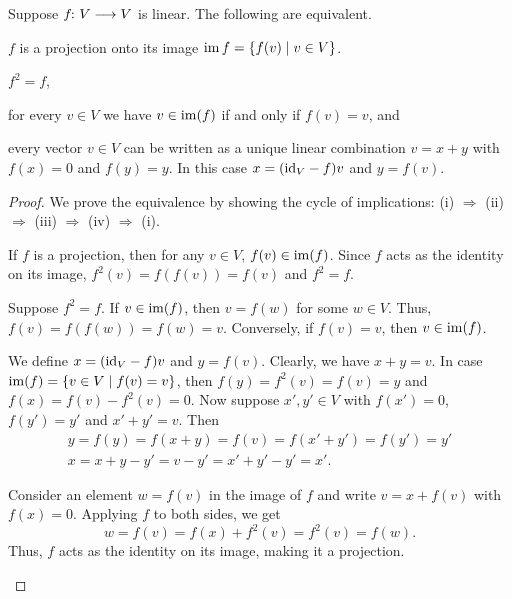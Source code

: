 \documentclass[a4paper, oneside, 12pt]{amsart}
\begin{document}
\begin{lemma}\label{lem:equivalent-characterisations-projections}
  Suppose \(f \from V\to V\) is linear.
  The following are equivalent.
  \begin{thmlist}
    \item \(f\) is a projection onto its image \(\operatorname{im} f =\{f(v) \mid v\in V\}\).
    \item\(f^{2} = f\),
    \item for every  \(v\in V\) we have \(v\in \operatorname{im}(f)\) if and only if \(f(v) = v\), and
    \item every vector \(v\in V\) can be written as a unique linear combination \(v= x+y\) with \(f(x) = 0\) and \(f(y) = y\).
    In this case \(x= (\mathrm{id}_{V} -f) v\) and \(y = f(v)\).
  \end{thmlist}
\end{lemma}
\begin{proof}
  We prove the equivalence by showing the cycle of implications: (i) \(\Rightarrow\) (ii) \(\Rightarrow\) (iii) \(\Rightarrow\) (iv) \(\Rightarrow\) (i).

  \begin{thmlist}[leftmargin=5em]
    \item[(i) \(\Rightarrow\) (ii):]
    If \( f \) is a projection, then for any \( v \in V \), \( f(v) \in \operatorname{im}(f) \). Since \( f \) acts as the identity on its image, \( f^2(v) = f(f(v)) = f(v) \) and \( f^2 = f \).

    \item[(ii) \(\Rightarrow\) (iii):]
    Suppose \( f^2 = f \). If \( v \in \operatorname{im}(f) \), then \( v = f(w) \) for some \( w \in V \). Thus, \( f(v) = f(f(w)) = f(w) = v \). Conversely, if \( f(v) = v \), then \( v \in \operatorname{im}(f) \).

    \item[(iii) \(\Rightarrow\) (iv):]
    We define \(x =(\mathrm{id}_{V} - f) v \) and \(y = f(v)\).
    Clearly, we have \(x + y = v\).
    In case \(\operatorname{im}(f) = \{ v \in V \mid f(v) = v \} \), then
    \(f(y) = f^{2}(v) = f(v) = y\) and \(f(x) = f(v) - f^{2}(v) = 0\).
    Now suppose \(x',y' \in V\) with \(f(x') = 0\), \(f(y') = y' \) and \(x' +y'= v \).
    Then
    \begin{gather*}
      y = f(y) =  f(x+y) = f(v) = f(x' + y') = f(y') = y'\\
      x = x + y -y' = v - y' = x' + y' -y' = x'.
    \end{gather*}
    \item[(iv) \(\Rightarrow\) (i):]
    Consider an element \( w = f(v) \) in the image of \(f\) and write \( v = x + f(v) \) with \( f(x) = 0 \).
    Applying \( f \) to both sides, we get
    \begin{equation*}
      w = f(v) = f(x) + f^2(v) = f^2(v) = f(w) .
    \end{equation*}
    Thus, \(f\)  acts as the identity on its image, making it a projection. \qedhere
  \end{thmlist}
\end{proof}
\end{document}
